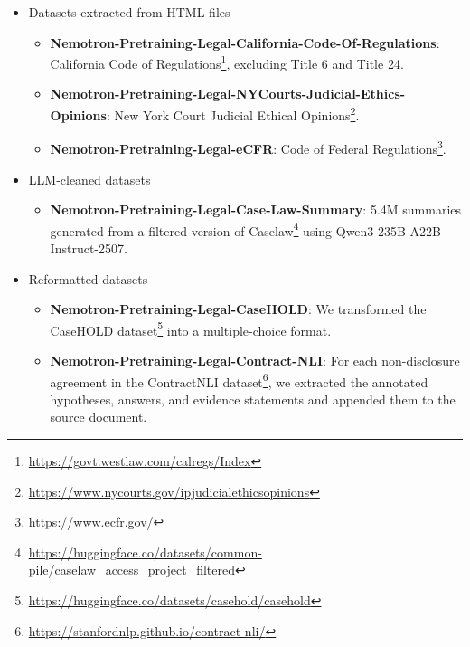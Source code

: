 \begin{itemize}
    \item Datasets extracted from HTML files
    \begin{itemize}
        \item \textbf{Nemotron-Pretraining-Legal-California-Code-Of-Regulations}: California Code of Regulations\footnote{\url{https://govt.westlaw.com/calregs/Index}}, excluding Title 6 and Title 24.
        \item \textbf{Nemotron-Pretraining-Legal-NYCourts-Judicial-Ethics-Opinions}: New York Court Judicial Ethical Opinions\footnote{\url{https://www.nycourts.gov/ipjudicialethicsopinions}}.
        \item \textbf{Nemotron-Pretraining-Legal-eCFR}: Code of Federal Regulations\footnote{\url{https://www.ecfr.gov/}}.
    \end{itemize}

    \item LLM-cleaned datasets
    \begin{itemize}
        \item \textbf{Nemotron-Pretraining-Legal-Case-Law-Summary}: 5.4M summaries generated from a filtered version of Caselaw\footnote{\url{https://huggingface.co/datasets/common-pile/caselaw_access_project_filtered}} using Qwen3-235B-A22B-Instruct-2507.
    \end{itemize}

    \item Reformatted datasets
    \begin{itemize}
        \item \textbf{Nemotron-Pretraining-Legal-CaseHOLD}: We transformed the CaseHOLD dataset\footnote{\url{https://huggingface.co/datasets/casehold/casehold}} into a multiple-choice format.
        \item \textbf{Nemotron-Pretraining-Legal-Contract-NLI}: For each non-disclosure agreement in the ContractNLI dataset\footnote{\url{https://stanfordnlp.github.io/contract-nli/}}, we extracted the annotated hypotheses, answers, and evidence statements and appended them to the source document.
    \end{itemize}


\end{itemize}
